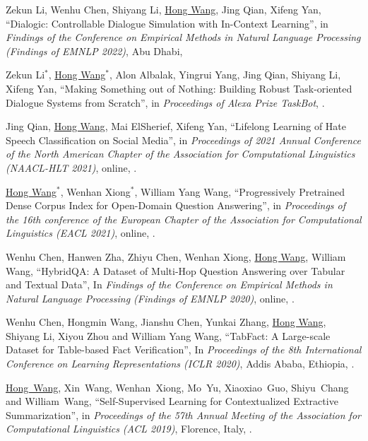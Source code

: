 \documentclass[letterpaper,MMMyyyy,nonstopmode]{simpleresumecv}
\begin{document}
\begin{Body}
\begin{enumerate}[label={[\arabic*]~~}]
\item 
Zekun Li, Wenhu Chen, Shiyang Li, \underline{Hong Wang}, Jing Qian, Xifeng Yan,
``Dialogic: Controllable Dialogue Simulation with In-Context Learning'',
in \textit{Findings of the Conference on Empirical Methods in Natural Language Processing (Findings of EMNLP 2022)}, Abu Dhabi,

\item
Zekun Li$^*$, \underline{Hong Wang}$^*$, Alon Albalak, Yingrui Yang, Jing Qian, Shiyang Li, Xifeng Yan,
``Making Something out of Nothing: Building Robust Task-oriented Dialogue Systems from Scratch'',
in \textit{Proceedings of Alexa Prize TaskBot},
.

\item
Jing Qian, \underline{Hong Wang}, Mai ElSherief, Xifeng Yan, 
``Lifelong Learning of Hate Speech Classification on Social Media'',
in \textit{Proceedings of 2021 Annual Conference of the North American Chapter of the Association for Computational Linguistics (NAACL-HLT 2021)}, online, .

\item
\underline{Hong Wang}$^*$, Wenhan Xiong$^*$, William Yang Wang,
``Progressively Pretrained Dense Corpus Index for Open-Domain Question Answering'',
in \textit{Proceedings of the 16th conference of the European Chapter of the Association for Computational Linguistics (EACL 2021)}, online, 
.

\item
Wenhu Chen, Hanwen Zha, Zhiyu Chen, Wenhan Xiong, \underline{Hong Wang}, William Wang,
``HybridQA: A Dataset of Multi-Hop Question Answering over Tabular and Textual Data'',
In \textit{Findings of the Conference on Empirical Methods in Natural Language Processing (Findings of EMNLP 2020)}, online, 
.

\item
Wenhu Chen, Hongmin Wang, Jianshu Chen, Yunkai Zhang, \underline{Hong Wang}, Shiyang Li, Xiyou Zhou and William Yang Wang,
``TabFact: A Large-scale Dataset for Table-based Fact Verification'',
In \textit{Proceedings of the 8th International Conference on Learning Representations (ICLR 2020)}, Addis Ababa, Ethiopia,
.

\item
\underline{Hong~Wang}, Xin~Wang, Wenhan~Xiong, Mo~Yu, Xiaoxiao~Guo, Shiyu~Chang and William~Wang,
``Self-Supervised Learning for Contextualized Extractive Summarization'',
in \textit{Proceedings of the 57th Annual Meeting of the Association for Computational Linguistics (ACL 2019)},
Florence, Italy,
.


\end{enumerate}
\end{Body}
\end{document}
